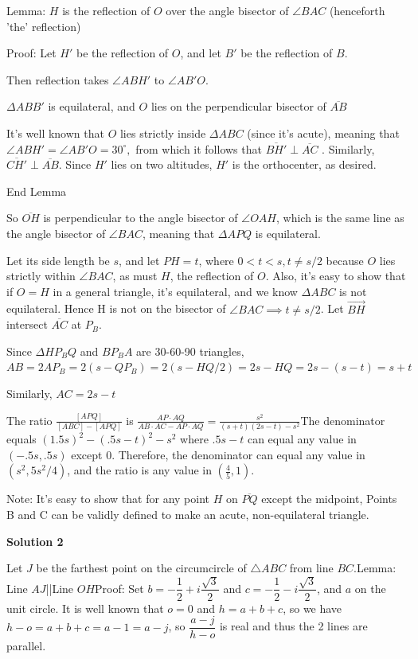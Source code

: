 \begin{enumerate}
 Lemma: $H$ is the reflection of $O$ over the angle bisector of $\angle BAC$ (henceforth 'the' reflection)

 Proof: Let $H'$ be the reflection of $O$, and let $B'$ be the reflection of $B$. 

 Then reflection takes $\angle ABH'$ to $\angle AB'O$.

 $\Delta ABB'$ is equilateral, and $O$ lies on the perpendicular bisector of $\overline{AB}$ 

 It's well known that $O$ lies strictly inside $\Delta ABC$ (since it's acute), meaning that $\angle ABH' = \angle AB'O = 30^{\circ},$ from which it follows that $\overline{BH'} \perp \overline{AC}$ . Similarly,  $\overline{CH'} \perp \overline{AB}$. Since $H'$ lies on two altitudes, $H'$ is the orthocenter, as desired.

 End Lemma

 So $\overline{OH}$ is perpendicular to the angle bisector of $\angle OAH$, which is the same line as the angle bisector of $\angle BAC$, meaning that $\Delta APQ$ is equilateral. 

 Let its side length be $s$, and let $PH=t$, where $0 < t < s, t \neq s/2$ because $O$ lies strictly within $\angle BAC$, as must $H$, the reflection of $O$. Also, it's easy to show that if $O=H$ in a general triangle, it's equilateral, and we know $\Delta ABC$ is not equilateral. Hence H is not on the bisector of $\angle BAC \implies t \neq s/2$. Let $\overrightarrow{BH}$ intersect $\overline{AC}$ at $P_B$. 

 Since $\Delta HP_BQ$ and $BP_BA$ are 30-60-90 triangles, $AB=2AP_B=2(s-QP_B)=2(s-HQ/2)=2s-HQ=2s-(s-t)=s+t$

 Similarly, $AC=2s-t$

 The ratio $\frac{[APQ]}{[ABC]-[APQ]}$ is $\frac{AP \cdot AQ}{AB \cdot AC - AP \cdot AQ} = \frac{s^2}{(s+t)(2s-t)-s^2}$The denominator equals $(1.5s)^2-(.5s-t)^2-s^2$ where $.5s-t$ can equal any value in $(-.5s, .5s)$ except $0$. Therefore, the denominator can equal any value in $(s^2, 5s^2/4)$, and the ratio is any value in $\boxed{\left(\frac{4}{5},1\right)}.$

 Note: It's easy to show that for any point $H$ on $\overline{PQ}$ except the midpoint, Points B and C can be validly defined to make an acute, non-equilateral triangle.

 



\textbf{Solution 2}

Let $J$ be the farthest point on the circumcircle of $\triangle{ABC}$ from line $BC$.Lemma: Line $AJ$||Line $OH$Proof: Set $b=-\dfrac{1}{2}+i\dfrac{\sqrt{3}}{2}$ and $c=-\dfrac{1}{2}-i\dfrac{\sqrt{3}}{2}$, and $a$ on the unit circle. It is well known that $o=0$ and $h=a+b+c$, so we have $h-o=a+b+c=a-1=a-j$, so $\dfrac{a-j}{h-o}$ is real and thus the 2 lines are parallel.


\end{enumerate}
